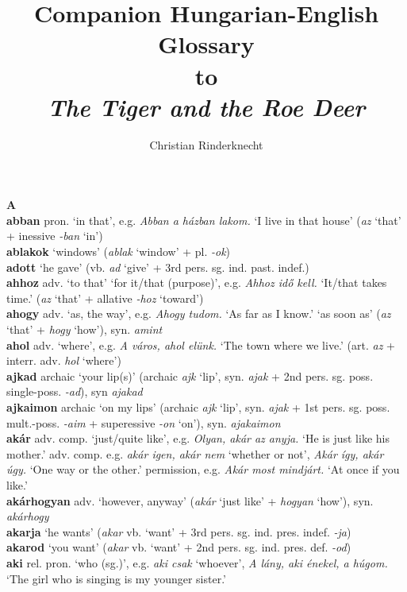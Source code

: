 \documentclass[11pt]{article}
\title{Companion Hungarian-English Glossary \\
to \\
\emph{The Tiger and the Roe Deer}}
\author{Christian Rinderknecht\\}
\date{\oldstylenums{2026}}
\begin{document}
\maketitle

\noindent \textbf{\large A} \\
\textbf{abban} pron. `in that', e.g. \emph{Abban a házban lakom.} `I live in that
house' (\emph{az} `that' + inessive \emph{-ban} `in')\\
\textbf{ablakok} `windows' (\emph{ablak} `window' + pl. \emph{-ok}) \\
\textbf{adott} `he gave' (vb. \emph{ad} `give' + 3rd
pers. sg. ind. past. indef.) \\
\textbf{ahhoz} adv. `to that' \textbar\textbar{} `for it/that (purpose)',
e.g. \emph{Ahhoz idő kell.} `It/that takes time.' (\emph{az} `that' +
allative \emph{-hoz} `toward') \\
\textbf{ahogy} adv. `as, the way', e.g. \emph{Ahogy tudom.} `As far as I know.'
\textbar\textbar{} `as soon as' (\emph{az} `that' +
\emph{hogy} `how'), syn. \emph{amint} \\
\textbf{ahol} adv. `where', e.g. \emph{A város, ahol elünk.} `The town where we
live.' (art. \emph{az} + interr. adv. \emph{hol} `where') \\
\textbf{ajkad} archaic `your lip(s)' (archaic \emph{ajk} `lip', syn. \emph{ajak} +
2nd pers. sg. poss. single\hyp{}poss. \emph{-ad}), syn \emph{ajakad}\\
\textbf{ajkaimon} archaic `on my lips' (archaic \emph{ajk} `lip', syn. \emph{ajak}
+ 1st pers. sg. poss. mult.\hyp{}poss. \emph{-aim} + superessive \emph{-on}
`on'), syn. \emph{ajakaimon}\\
\textbf{akár} adv. comp. `just/quite like', e.g. \emph{Olyan, akár az anyja.}
`He is just like his mother.' \textbar\textbar{} adv. comp. e.g. \emph{akár igen,
akár nem} `whether or not', \emph{Akár így, akár úgy.} `One way or the other.'
\textbar\textbar{} permission, e.g. \emph{Akár most mindjárt.} `At once if you
like.'\\
\textbf{akárhogyan} adv. `however, anyway' (\emph{akár} `just like' +
\emph{hogy\-an} `how'), syn. \emph{akárhogy} \\
\textbf{akarja} `he wants' (\emph{akar} vb. `want' + 3rd
pers. sg. ind. pres. indef. \emph{-ja}) \\
\textbf{akarod} `you want' (\emph{akar} vb. `want' + 2nd
pers. sg. ind. pres. def. \emph{-od}) \\
\textbf{aki} rel. pron. `who (sg.)', e.g. \emph{aki csak} `whoever', \emph{A
lány, aki énekel, a húgom.} `The girl who is singing is my younger sister.' \\
\end{document}
